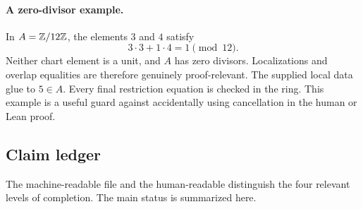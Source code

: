 \paragraph{A zero-divisor example.}
In $A=\mathbb Z/12\mathbb Z$, the elements $3$ and $4$ satisfy
\[
                         3\cdot3+1\cdot4=1\pmod{12}.
\]
Neither chart element is a unit, and $A$ has zero divisors.  Localizations and overlap equalities are
therefore genuinely proof-relevant.  The supplied local data glue to $5\in A$.  Every final
restriction equation is checked in the ring.  This example is a useful guard against accidentally
using cancellation in the human or Lean proof.

\subsection{Claim ledger}

The machine-readable file  and the human-readable
 distinguish the four relevant levels of completion.  The main
status is summarized here.

